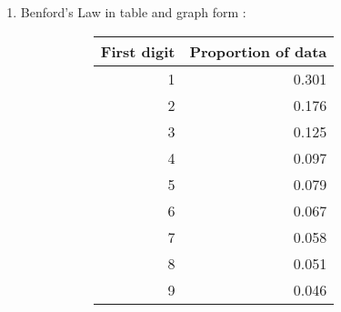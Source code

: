 \begin{enumerate}
\begin{subequations}
		The above holds true for real world populations with an almost equal number of men and women. Consider the special case with a fraction $ p $ of the town being male. 
		\begin{align}
			\overline{a_1} &= p_1 \overline{y_1} + (1 - p_1) \overline{x_1} \\
			\overline{a_2} &= p_2 \overline{y_2} + (1 - p_2) \overline{x_2} \\
		\end{align}
		
		It is easy to see that when $ p_1 << p_2 $, but the male and female weight averages are only slightly different between towns A and B, $ a_1 < a_2 $ is possible.
		
	\end{subequations}
	\item Benford's Law in table and graph form : 
	\begin{figure}[H]
		\begin{subfigure}[]{0.45\linewidth}
			\centering
			\begin{table}[H]
				\centering
				\begin{tabular}{@{}rr@{}}
					\toprule
					First digit &  Proportion of data \\
					\midrule
					1 &               0.301 \\
					2 &               0.176 \\
					3 &               0.125 \\
					4 &               0.097 \\
					5 &               0.079 \\
					6 &               0.067 \\
					7 &               0.058 \\
					8 &               0.051 \\
					9 &               0.046 \\
					\bottomrule
				\end{tabular}
			\end{table}
		\end{subfigure}
		\begin{subfigure}[]{0.45\linewidth}
			\centering
		\end{subfigure} \\		
	\end{figure}
	

\end{enumerate}
